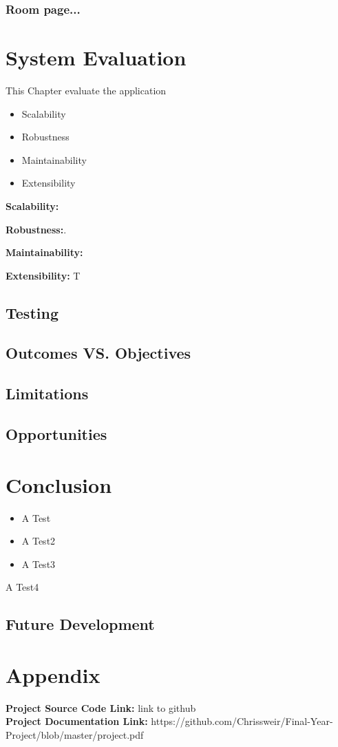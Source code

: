 \subsection{Room page...}


\chapter{System Evaluation}
This Chapter evaluate the application
\begin{itemize}
    \item Scalability
    \item Robustness
    \item Maintainability
    \item Extensibility
\end{itemize}

\par \textbf{Scalability:} 

\par \textbf{Robustness:}.

\par \textbf{Maintainability:}

\par \textbf{Extensibility:} T

\section{Testing}

\section{Outcomes VS. Objectives}

\section{Limitations}

\section{Opportunities}

\chapter{Conclusion}


\begin{itemize}
\item A Test

\item A Test2
\item A Test3
\end{itemize}
A Test4
\section{Future Development}

\chapter{Appendix}

\textbf{Project Source Code Link: }link to github \\
\textbf{Project Documentation Link: }https://github.com/Chrissweir/Final-Year-Project/blob/master/project.pdf \\

